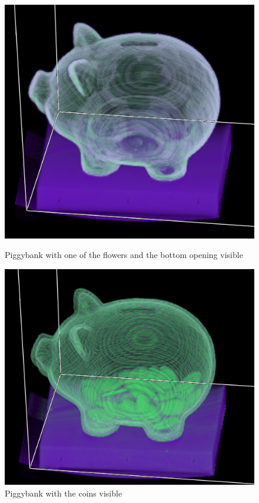 \documentclass[a4paper,twoside,11pt]{article}
\begin{document}
   \begin{figure}[H]
  \includegraphics[width=\linewidth]{images/pigComp}
  \caption{Piggybank with one of the flowers and the bottom opening visible}\label{pigComp}
\endminipage\hfill
{}
  \includegraphics[width=\linewidth]{images/pigComp2}
  \caption{Piggybank with the coins visible}\label{pigComp2}
\endminipage\hfill
 \end{figure}
 
\end{document}
